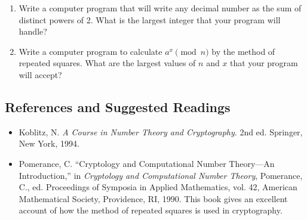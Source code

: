  
{\small
\begin{enumerate}
 
 
\item
Write a computer program that will write any decimal number as the sum
of distinct powers of 2.  What is the largest integer that your
program will handle?
 
 
\item
Write a computer program to calculate $a^x \pmod{ n}$ by the method of
repeated squares.  What are the largest values of $n$ and $x$ that
your program will accept?  
 
 
\end{enumerate}
}
 
 
\subsection*{References and Suggested Readings}
 
 
{\small
\begin{itemize}
 
\item[{\bf [1]}] %
Koblitz, N. {\it A Course in Number Theory and Cryptography}. 2nd ed.
Springer, New York, 1994.  
 
 
\item[{\bf [2]}]
Pomerance, C. ``Cryptology and Computational Number Theory---An
Introduction,'' in {\it Cryptology and Computational Number Theory},
Pomerance, C., ed. Proceedings of Symposia in Applied Mathematics,
vol. 42, American Mathematical Society, Providence, RI, 1990.  This
book gives an excellent account of how the method of repeated squares
is used in cryptography. 
 
\end{itemize}
}
 
 
 
